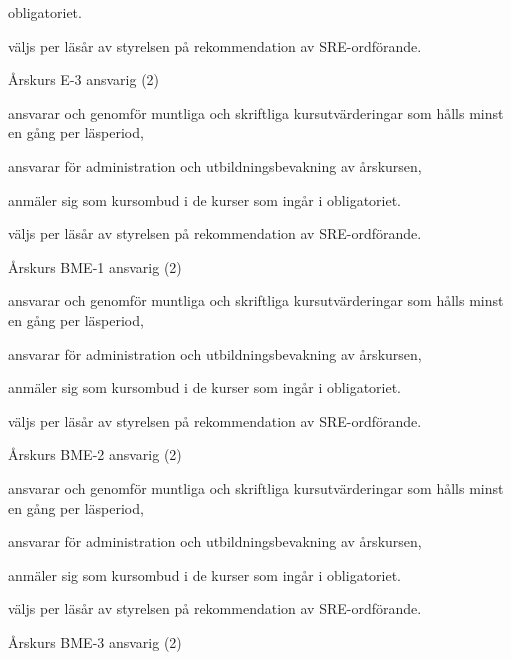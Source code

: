 \documentclass[10pt]{article}
\begin{document}
\begin{emptylist}
\begin{dashlist}
                obligatoriet.
              \item väljs per läsår av styrelsen på rekommendation av SRE-ordförande.
        \end{dashlist}
    \item Årskurs E-3 ansvarig (2)
        \begin{dashlist}
            \item ansvarar och genomför muntliga och skriftliga
                kursutvärderingar som hålls minst en gång per läsperiod,
            \item ansvarar för administration och utbildningsbevakning av
                årskursen,
            \item anmäler sig som kursombud i de kurser som ingår i
                obligatoriet.
             \item väljs per läsår av styrelsen på rekommendation av SRE-ordförande.
        \end{dashlist}
    \item Årskurs BME-1 ansvarig (2)
        \begin{dashlist}
            \item ansvarar och genomför muntliga och skriftliga
                kursutvärderingar som hålls minst en gång per läsperiod,
            \item ansvarar för administration och utbildningsbevakning av
                årskursen,
            \item anmäler sig som kursombud i de kurser som ingår i
                obligatoriet.
              \item väljs per läsår av styrelsen på rekommendation av SRE-ordförande.
        \end{dashlist}
    \item Årskurs BME-2 ansvarig (2)
        \begin{dashlist}
            \item ansvarar och genomför muntliga och skriftliga
                kursutvärderingar som hålls minst en gång per läsperiod,
            \item ansvarar för administration och utbildningsbevakning av
                årskursen,
            \item anmäler sig som kursombud i de kurser som ingår i
                obligatoriet.
             \item väljs per läsår av styrelsen på rekommendation av SRE-ordförande.
        \end{dashlist}
    \item Årskurs BME-3 ansvarig (2)

\end{emptylist}
\end{document}
